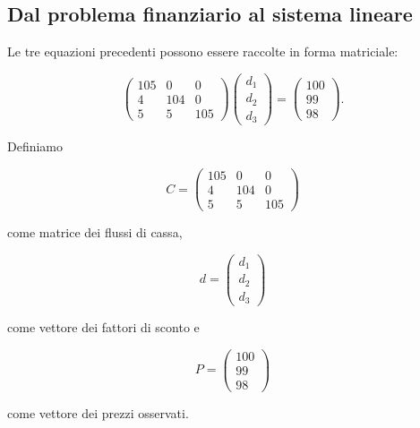 \subsection{Dal problema finanziario al sistema lineare}

Le tre equazioni precedenti possono essere raccolte in forma
matriciale:

\begin{equation*}
\begin{pmatrix}
105 & 0   & 0\\
4   & 104 & 0\\
5   & 5   & 105
\end{pmatrix}
\begin{pmatrix}
d_1\\
d_2\\
d_3
\end{pmatrix}
=
\begin{pmatrix}
100\\
99\\
98
\end{pmatrix}.
\label{eq:bond-matrix-example}
\end{equation*}

Definiamo

\begin{equation*}
C=
\begin{pmatrix}
105 & 0   & 0\\
4   & 104 & 0\\
5   & 5   & 105
\end{pmatrix}
\end{equation*}

come matrice dei flussi di cassa,

\begin{equation*}
d=
\begin{pmatrix}
d_1\\
d_2\\
d_3
\end{pmatrix}
\end{equation*}

come vettore dei fattori di sconto e

\begin{equation*}
P=
\begin{pmatrix}
100\\
99\\
98
\end{pmatrix}
\end{equation*}

come vettore dei prezzi osservati.

